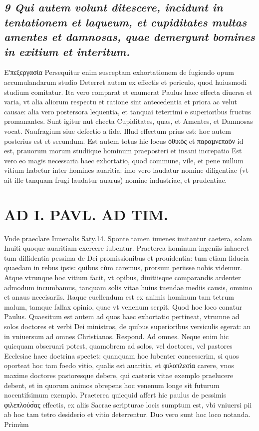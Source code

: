 \documentclass{article}
\begin{document}
\begin{pages}
\subsection*{\textit{9 Qui autem volunt ditescere, incidunt in tentationem et laqueum, et cupiditates multas amentes et damnosas, quae demergunt bomines in exitium et interitum. }}\pstart Εʹπεξεργασία Persequitur enim susceptam exhortationem de fugiendo opum accumulandarum studio Deterret autem ex effectis et periculo, quod huiusmodi studium comitatur. Ita vero comparat et enumerat Paulus haec effecta diuersa et varia, vt alia aliorum respectu et ratione sint antecedentia et priora ac velut causae: alia vero postersora lequentia, et tanquai teterrimi e superioribus fructus promanantes. Sunt igitur nut checta Cupiditates, quas, et Amentes, et Damnosas vocat. Naufragium siue defectio a fide. Illud effectum prius est: hoc autem posterius est et secundum.  \pend\pstart Est autem totus hic locus ὀθικὸς et παραμνεπαὸν id est, prauorum morum studiique hominum praeposteri et insani increpatio  \pend\pstart Est vero eo magis necessaria haec exhortatio, quod commune, vile, et pene nullum vitium habetur inter homines auaritia: imo vero laudatur nomine diligentiae (vt ait ille tanquam frugi laudatur auarus) nomine industriae, et prudentiae.  \pend
\section*{AD I. PAVL. AD TIM. }
\marginpar{[ p.44* ]}\pstart Vnde praeclare Iuuenalis Saty.14. Sponte tamen iuuenes imitantur caetera, solam Inuiti quoque auaritiam exercere iubentur. Praeterea hominum ingeniis inhaeret tum diffidentia pessima de Dei promissionibus et prouidentia: tum etiam fiducia quaedam in rebus ipsis: quibus cùm caremus, prorsum periisse nobis videmur. Atque vtrunque  hoc vitium facit, vt opibus, diuitiisque comparandis ardenter admodum incumbamus, tanquam solis vitae huius tuendae mediis causis, omnino et anaus neceisariis. Itaque euellendum est ex animis hominum tam tetrum malum, tamque fallax opinio, quae vt venenum serpit. Quod hoc loco conatur Paulus.  \pend\pstart Quaesitum est autem ad quos haec exhortatio pertineat, vtrumne ad solos doctores et verbi Dei ministros, de quibus superioribus versiculis egerat: an in vniuersum ad omnes Christianos. Respond. Ad omnes. Neque enim hic quicquam obseruari potest, quamobrem ad solos, vel doctores, vel pastores Ecclesiae haec doctrina spectet: quanquam hoc lubenter concesserim, si quos oporteat hoc tam foedo vitio, qualis est auaritia, et φιλοπλεσία carere, vnos maxime doctores pastoresque debere, qui caeteris vitae exemplo praelucere debent, et in quorum animos obrepens hoc venenum longe sit futurum nocentifsimum exemplo. Praeterea quicquid affert hic paulus de pessimis φιλεπλούσ́ας effectis, ex aliis Sacrae scripturae locis sumptum est, vbi vniuersi pii ab hoc tam tetro desiderio et vitio deterrentur.  \pend\pstart Duo vero sunt hoc loco notanda. Primùm  \pend

\end{pages}
\end{document}
